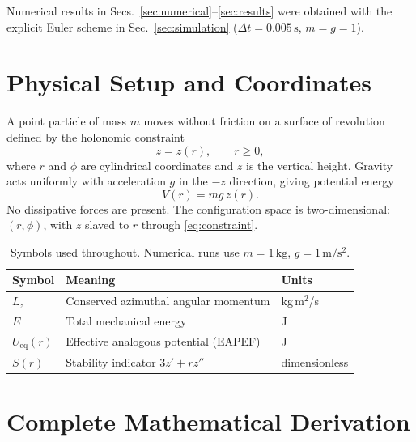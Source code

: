 \documentclass[11pt,letterpaper]{article}
\begin{document}
Numerical results in Secs.~\ref{sec:numerical}--\ref{sec:results} were obtained with the explicit Euler scheme in Sec.~\ref{sec:simulation} ($\Delta t=0.005\,\mathrm{s}$, $m=g=1$).

\section{Physical Setup and Coordinates}

A point particle of mass $m$ moves without friction on a surface of revolution defined by the holonomic constraint
\begin{equation}\label{eq:constraint}
    z = z(r), \qquad r\ge 0,
\end{equation}
where $r$ and $\phi$ are cylindrical coordinates and $z$ is the vertical height. Gravity acts uniformly with acceleration $g$ in the $-z$ direction, giving potential energy
\begin{equation}\label{eq:V}
    V(r) = mg\,z(r).
\end{equation}
No dissipative forces are present. The configuration space is two-dimensional: $(r,\phi)$, with $z$ slaved to $r$ through \eqref{eq:constraint}.

\begin{table}[htbp]
    \centering
    \caption{Symbols used throughout. Numerical runs use $m=1\,\mathrm{kg}$, $g=1\,\mathrm{m/s^2}$.}
    \label{tab:symbols}
    \begin{tabular}{lll}
        \toprule
        Symbol & Meaning & Units \\
        \midrule
        $L_z$ & Conserved azimuthal angular momentum & kg\,m$^2$/s \\
        $E$ & Total mechanical energy & J \\
        $U_{\mathrm{eq}}(r)$ & Effective analogous potential (EAPEF) & J \\
        $S(r)$ & Stability indicator $3z'+rz''$ & dimensionless \\
        \bottomrule
    \end{tabular}
\end{table}

\section{Complete Mathematical Derivation}
\end{document}
